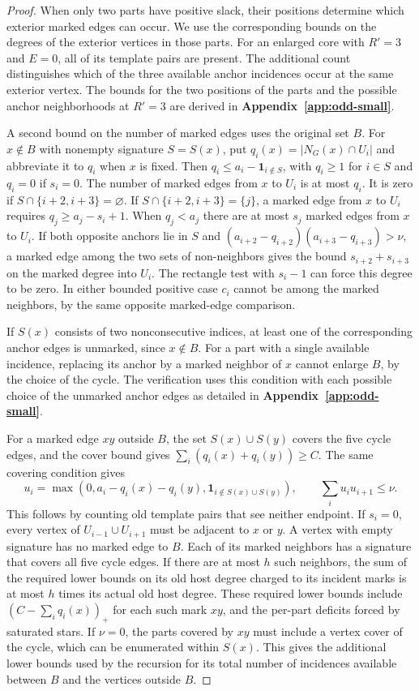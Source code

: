 \begin{proof}
When only two parts have positive slack, their positions determine
which exterior marked edges can occur. We use the corresponding
bounds on the degrees of the exterior vertices in those parts.
For an enlarged core with $R'=3$ and $E=0$, all of its template
pairs are present. The additional count distinguishes which of the
three available anchor incidences occur at the same exterior vertex.
The bounds for the two positions of the parts and the possible
anchor neighborhoods at $R'=3$ are derived in
\textbf{Appendix~\ref{app:odd-small}}.

A second bound on the number of marked edges uses the original set $B$.
For $x\notin B$ with nonempty signature $S=S(x)$, put
$q_i(x)=|N_G(x)\cap U_i|$ and abbreviate it to $q_i$ when $x$
is fixed. Then $q_i\leq a_i-\mathbf1_{i\notin S}$, with $q_i\geq1$
for $i\in S$ and $q_i=0$ if $s_i=0$. The number of marked edges
from $x$ to $U_i$ is at most $q_i$. It is zero if
$S\cap\{i+2,i+3\}=\varnothing$. If $S\cap\{i+2,i+3\}=\{j\}$,
a marked edge from $x$ to $U_i$ requires $q_j\geq a_j-s_i+1$.
When $q_j<a_j$ there are at most $s_j$ marked edges from $x$ to $U_i$. If both opposite anchors lie in $S$ and
$(a_{i+2}-q_{i+2})(a_{i+3}-q_{i+3})>\nu$, a marked edge among
the two sets of non-neighbors gives the bound $s_{i+2}+s_{i+3}$
on the marked degree into $U_i$. The rectangle test with $s_i-1$
can force this degree to be zero. In either bounded positive case
$c_i$ cannot be among the marked neighbors, by the same opposite
marked-edge comparison.

If $S(x)$ consists of two nonconsecutive indices, at least one
of the corresponding anchor edges is unmarked, since $x\notin B$.
For a part with a single available incidence, replacing its anchor by
a marked neighbor of $x$ cannot enlarge $B$, by the choice of the
cycle. The verification uses this condition with each possible choice
of the unmarked anchor edges as detailed in \textbf{Appendix~\ref{app:odd-small}}.

For a marked edge $xy$ outside $B$, the set $S(x)\cup S(y)$
covers the five cycle edges, and the cover bound gives
$\sum_i(q_i(x)+q_i(y))\ge C$. The same covering condition gives
\[
 u_i=\max(0,a_i-q_i(x)-q_i(y),\mathbf1_{i\notin S(x)\cup S(y)}),
 \qquad \sum_i u_i u_{i+1}\leq \nu.
\]
This follows by counting old template pairs that see neither endpoint.
If $s_i=0$, every vertex of $U_{i-1}\cup U_{i+1}$ must be
adjacent to $x$ or $y$. A vertex with empty signature has no marked
edge to $B$. Each of its marked neighbors has a signature that
covers all five cycle edges. If there are at most $h$ such neighbors, the sum of
the required lower bounds on its old host degree charged to its
incident marks is at most $h$ times its actual old host degree.
These required lower bounds include $(C-\sum_i q_i(x))_+$ for each
such mark $xy$, and the per-part deficits forced by saturated stars.
If $\nu=0$, the parts covered by $xy$ must include a vertex cover of
the cycle, which can be enumerated within $S(x)$. This gives the
additional lower bounds used by the recursion for its total number of incidences available between $B$ and the vertices outside $B$.


\end{proof}
